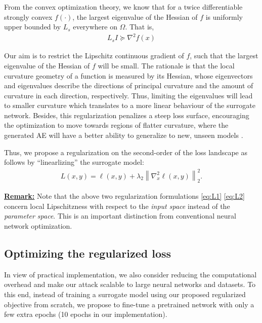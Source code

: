\documentclass[letterpaper]{article} %
\theoremstyle{plain}
\theoremstyle{definition}
\newcommand{\red}[1]{\textcolor{red}{[#1]}}
\newcommand{\blue}[1]{\textcolor{blue}{[#1]}}
\begin{document}
From the convex optimization theory, we know that for a twice differentiable strongly convex $f(\cdot)$, the largest eigenvalue of the Hessian of $f$ is uniformly upper bounded by $L_s$ everywhere on $\Omega$. That is,
\begin{align}
L_s I \succeq \nabla^2 f(x)
\end{align}

Our aim is to restrict the Lipschitz continuous gradient of $f$, such that the largest eigenvalue of the Hessian of $f$ will be small. The rationale is that the local curvature geometry of a function is measured by its Hessian, whose eigenvectors and eigenvalues describe the directions of principal curvature and the amount of curvature in each direction, respectively. Thus, limiting the eigenvalues will lead to smaller curvature which translates to a more linear behaviour of the surrogate network. Besides, this regularization penalizes a steep loss surface, encouraging the optimization to move towards regions of flatter curvature, where the generated AE will have a better ability to generalize to new, unseen models \cite{qin2022boosting}. %


Thus, we propose a regularization on the second-order of the loss landscape as follows by ``linearlizing'' the surrogate model:
\begin{align}\label{eq:L2}
L({x, y}) = \ell(x, y) + \lambda_2\left\|\nabla_{x}^{2} \ell(x, y)\right\|_{2}^{2}.
\end{align}

\underline{\bf Remark:}
Note that the above two regularization formulations \eqref{eq:L1} \eqref{eq:L2} concern local Lipschitzness with respect to the {\em input space} instead of the {\em parameter space}. This is an important distinction from conventional neural network optimization.


\subsection{Optimizing the regularized loss}

In view of practical implementation, we also consider reducing the computational overhead and make our attack scalable to large neural networks and datasets. To this end, instead of training a surrogate model using our proposed regularized objective from scratch, we propose to fine-tune a pretrained network with only a few extra epochs (10 epochs in our implementation).
\end{document}
